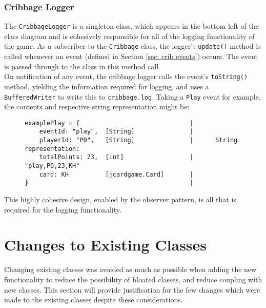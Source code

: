 \documentclass{article}
\begin{document}
\subsubsection{Cribbage Logger}
\label{sec: crib logger}
The \verb|CribbageLogger| is a singleton class, which appears in the bottom left of the class diagram and is cohesively responsible for all of the logging functionality of the game. As a subscriber to the \verb|Cribbage| class, the logger's \verb|update()| method is called whenever an event (defined in Section \ref{sec: crib events}) occurs. The event is passed through to the class in this method call.\\[2mm]
On notification of any event, the cribbage logger calls the event's \verb|toString()| method, yielding the information required for logging, and uses a \verb|BufferedWriter| to write this to \verb|cribbage.log|. Taking a \verb|Play| event for example, the contents and respective string representation might be:
\begin{figure}[H]
\centering
\begin{BVerbatim}
examplePlay = {                              |
    eventId: "play",  [String]               |
    playerId: "P0",   [String]               |      String representation:
    totalPoints: 23,  [int]                  |      "play,P0,23,KH"
    card: KH          [jcardgame.Card]       |  
}                                            |
\end{BVerbatim}
\end{figure}
\noindent This highly cohesive design, enabled by the observer pattern, is all that is required for the logging functionality.

\section{Changes to Existing Classes}
Changing existing classes was avoided as much as possible when adding the new functionality to reduce the possibility of bloated classes, and reduce coupling with new classes. This section will provide justification for the few changes which were made to the existing classes despite these considerations.
\end{document}
